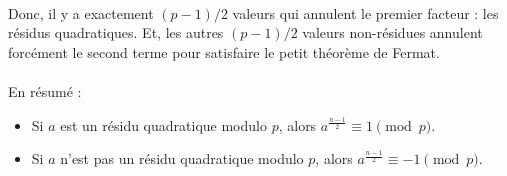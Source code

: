 		\paragraph{}Donc, il y a exactement $(p-1)/2$ valeurs qui annulent le premier facteur : les résidus quadratiques. Et, les autres $(p-1)/2$ valeurs non-résidues annulent forcément le second terme pour satisfaire le petit théorème de Fermat.
		\paragraph{}En résumé :
			\begin{itemize}
				\item Si $a$ est un résidu quadratique modulo $p$, alors $a^{\frac{n-1}{2}} \equiv 1 \pmod p$.
				\item Si $a$ n'est pas un résidu quadratique modulo $p$, alors $a^{\frac{n-1}{2}} \equiv -1 \pmod p$.
			\end{itemize}
